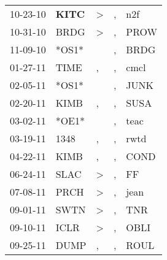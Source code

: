 \begin{supertabular}{p{0.07\textwidth}p{0.06\textwidth}p{0.02\textwidth}p{0.02\textwidth}p{0.06\textwidth}}
          10-23-10\textsuperscript{} &  \textbf{KITC\textsuperscript{}} &     \textgreater &                , &            n2f\textsuperscript{} \\
          10-31-10\textsuperscript{} &           BRDG\textsuperscript{} &     \textgreater &                , &           PROW\textsuperscript{} \\
          11-09-10\textsuperscript{} &                            *OS1* &                  &                , &           BRDG\textsuperscript{} \\
          01-27-11\textsuperscript{} &           TIME\textsuperscript{} &                , &                , &           cmcl\textsuperscript{} \\
          02-05-11\textsuperscript{} &                            *OS1* &                  &                , &           JUNK\textsuperscript{} \\
          02-20-11\textsuperscript{} &           KIMB\textsuperscript{} &                , &                , &           SUSA\textsuperscript{} \\
          03-02-11\textsuperscript{} &                            *OE1* &                  &                , &           teac\textsuperscript{} \\
          03-19-11\textsuperscript{} &           1348\textsuperscript{} &                , &                , &           rwtd\textsuperscript{} \\
          04-22-11\textsuperscript{} &           KIMB\textsuperscript{} &                , &                , &           COND\textsuperscript{} \\
          06-24-11\textsuperscript{} &           SLAC\textsuperscript{} &     \textgreater &                , &             FF\textsuperscript{} \\
          07-08-11\textsuperscript{} &           PRCH\textsuperscript{} &     \textgreater &                , &           jean\textsuperscript{} \\
          09-01-11\textsuperscript{} &           SWTN\textsuperscript{} &     \textgreater &                , &            TNR\textsuperscript{} \\
          09-10-11\textsuperscript{} &           ICLR\textsuperscript{} &     \textgreater &                , &           OBLI\textsuperscript{} \\
          09-25-11\textsuperscript{} &           DUMP\textsuperscript{} &                , &                , &           ROUL\textsuperscript{} \\

\end{supertabular}

